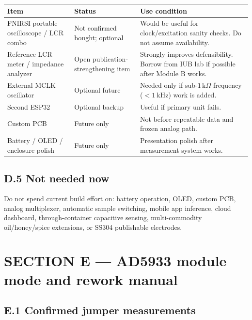\documentclass[11pt,a4paper]{article}
\newcommand{\kohm}[1]{\ensuremath{#1\,\mathrm{k}\Omega}}
\begin{document}
\begin{xltabular}{\textwidth}{L{38mm}L{22mm}Y}
\toprule
\textbf{Item} & \textbf{Status} & \textbf{Use condition}\\
\midrule
FNIRSI portable oscilloscope / LCR combo & Not confirmed bought; optional & Would be useful for clock/excitation sanity checks. Do not assume availability.\\
Reference LCR meter / impedance analyzer & Open publication-strengthening item & Strongly improves defensibility. Borrow from IUB lab if possible after Module B works.\\
External MCLK oscillator & Optional future & Needed only if sub-\kohm{1} frequency ($<\SI{1}{\kilo\hertz}$) work is added.\\
Second ESP32 & Optional backup & Useful if primary unit fails.\\
Custom PCB & Future only & Not before repeatable data and frozen analog path.\\
Battery / OLED / enclosure polish & Future only & Presentation polish after measurement system works.\\
\bottomrule
\end{xltabular}

\subsection{D.5 Not needed now}

\begin{rulebox}
Do not spend current build effort on: battery operation, OLED, custom PCB, analog multiplexer, automatic sample switching, mobile app inference, cloud dashboard, through-container capacitive sensing, multi-commodity oil/honey/spice extensions, or SS304 publishable electrodes.
\end{rulebox}

\section{SECTION E --- AD5933 module mode and rework manual}
\label{sec:E}

\subsection{E.1 Confirmed jumper measurements}
\end{document}
